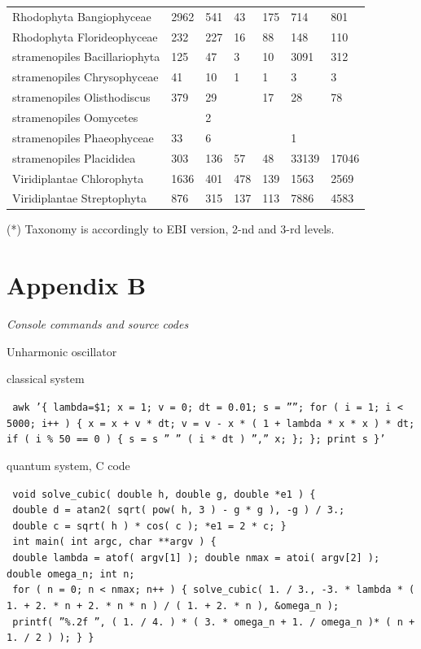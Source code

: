 \documentclass[a4paper]{article}
\begin{document}
{\begin{tabular}{lllllll}
Rhodophyta Bangiophyceae&2962&541&43&175&714&801\\
Rhodophyta Florideophyceae&232&227&16&88&148&110\\
stramenopiles Bacillariophyta&125&47&3&10&3091&312\\
stramenopiles Chrysophyceae&41&10&1&1&3&3\\
stramenopiles Olisthodiscus&379&29&&17&28&78\\
stramenopiles Oomycetes&&2&&&&\\
stramenopiles Phaeophyceae&33&6&&&1&\\
stramenopiles Placididea&303&136&57&48&33139&17046\\
Viridiplantae Chlorophyta&1636&401&478&139&1563&2569\\
Viridiplantae Streptophyta&876&315&137&113&7886&4583\\
\hline
\end{tabular}
}

{\small(*) Taxonomy is accordingly to EBI version, 2-nd and 3-rd levels.}

\newpage
\section*{Appendix B} 

\textit{Console commands and source codes} 

\vskip 5pt

Unharmonic oscillator

classical system

\texttt{\small{ awk '\{ lambda=\$1; x = 1; v = 0; dt = 0.01; s = ''''; for ( i = 1; i < 5000; i++ ) \{ x = x + v * dt; v = v - x * ( 1 + lambda * x * x ) * dt; if ( i \% 50 == 0 ) \{ s = s '' '' ( i * dt ) '','' x; \}; \}; print s \}' }}

quantum system, C code

\texttt{\small{ void solve\_cubic( double h, double g, double *e1 ) \{ }} \\
\texttt{\small{ double d = atan2( sqrt( pow( h, 3 ) - g * g ), -g ) / 3.; }}\\
\texttt{\small{ double c = sqrt( h ) * cos( c ); *e1 = 2 * c; \} }} \\
\texttt{\small{ int main( int argc, char **argv ) \{ }} \\
\texttt{\small{ double lambda = atof( argv[1] ); double nmax = atoi( argv[2] ); double omega\_n; int n; }} \\
\texttt{\small{ for ( n = 0; n < nmax; n++ ) \{ solve\_cubic( 1. / 3., -3. * lambda * ( 1. + 2. * n + 2. * n * n ) / ( 1. + 2. * n ), \&omega\_n ); }} \\
\texttt{\small{ printf( ''\%.2f '', ( 1. / 4. ) * ( 3. * omega\_n + 1. / omega\_n )* ( n + 1. / 2 ) ); \} \} }} 
\end{document}
